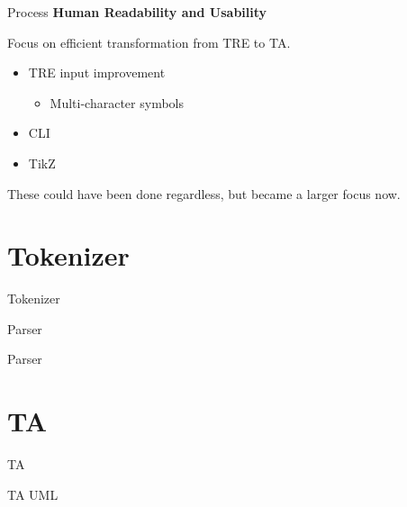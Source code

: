 \begin{frame}{Process}
    \textbf{Human Readability and Usability}

    Focus on efficient transformation from TRE to TA.
    \newline
    \begin{itemize}
        \item TRE input improvement
              \begin{itemize}
                  \item Multi-character symbols
              \end{itemize}
        \item CLI
        \item TikZ
    \end{itemize}

    These could have been done regardless, but became a larger focus now.
\end{frame}

\section{Tokenizer}

\begin{frame}[shrink=5]{Tokenizer}
    \begin{center}
        
    \end{center}
\end{frame}

\begin{frame}[shrink=20]{Parser}
    
\end{frame}

\begin{frame}[shrink=10]{Parser}
    \begin{center}
        
    \end{center}
\end{frame}

\section{TA}
\begin{frame}[shrink=5]{TA}
    \begin{center}
        
    \end{center}
\end{frame}
\begin{frame}[shrink=10]{TA UML}
    \begin{center}
        
    \end{center}
\end{frame}

